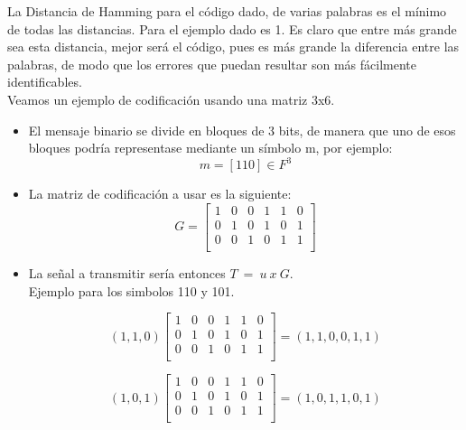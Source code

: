La Distancia de Hamming para el código dado, de varias palabras es el mínimo de todas las distancias. Para el ejemplo dado es 1. Es claro que entre más grande sea esta distancia, mejor será el código, pues es más grande la diferencia entre las palabras, de modo que los errores que puedan resultar son más fácilmente identificables.\\

Veamos un ejemplo de codificación usando una matriz 3x6.\\

\begin{itemize}
    \item El mensaje binario se divide en bloques de 3 bits, de manera que uno de esos bloques podría representase mediante un símbolo m, por ejemplo:
    \begin{equation} \label{capsiete_doce}
    m = [110] \in F^{3}  
    \end{equation}
     \item La matriz de codificación a usar es la siguiente:
    \begin{equation} \label{capsiete_trece}     
G= 
\begin{bmatrix}
    1 & 0 & 0 & 1 & 1 & 0 \\
    0 & 1 & 0 & 1 & 0 & 1 \\
    0 & 0 & 1 & 0 & 1 & 1 \\
\end{bmatrix}
    \end{equation}
    
    \item La señal a transmitir sería entonces $T \ = \ u \ x \ G$. \\
    Ejemplo para los simbolos 110 y 101.
    
        \begin{equation} \label{capsiete_catorce}     
(1,1,0)
\begin{bmatrix}
    1 & 0 & 0 & 1 & 1 & 0 \\
    0 & 1 & 0 & 1 & 0 & 1 \\
    0 & 0 & 1 & 0 & 1 & 1 \\
\end{bmatrix} = (1,1,0,0,1,1)
    \end{equation}

        \begin{equation} \label{capsiete_quince}     
(1,0,1)
\begin{bmatrix}
    1 & 0 & 0 & 1 & 1 & 0 \\
    0 & 1 & 0 & 1 & 0 & 1 \\
    0 & 0 & 1 & 0 & 1 & 1 \\
\end{bmatrix} = (1,0,1,1,0,1)
    \end{equation}
\end{itemize}

